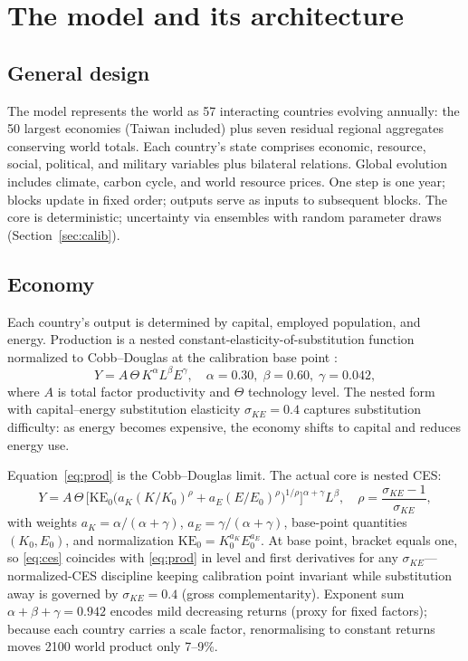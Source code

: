 \documentclass[a4paper,fleqn]{cas-sc}
\begin{document}
\section{The model and its architecture}


\subsection{General design}

The model represents the world as 57 interacting countries evolving annually: the 50 largest economies (Taiwan included) plus seven residual regional aggregates conserving world totals. Each country's state comprises economic, resource, social, political, and military variables plus bilateral relations. Global evolution includes climate, carbon cycle, and world resource prices. One step is one year; blocks update in fixed order; outputs serve as inputs to subsequent blocks. The core is deterministic; uncertainty via ensembles with random parameter draws (Section~\ref{sec:calib}).

\subsection{Economy}

Each country's output is determined by capital, employed population, and energy. Production is a nested constant-elasticity-of-substitution function normalized to Cobb--Douglas at the calibration base point \citep{arrow1961}:
\begin{equation}
Y = A \, \Theta \, K^{\alpha} L^{\beta} E^{\gamma}, \quad \alpha = 0.30,\; \beta = 0.60,\; \gamma = 0.042,
\label{eq:prod}
\end{equation}
where $A$ is total factor productivity and $\Theta$ technology level. The nested form with capital--energy substitution elasticity $\sigma_{KE}=0.4$ \citep{vanderwerf2008,koetse2008} captures substitution difficulty: as energy becomes expensive, the economy shifts to capital and reduces energy use.

Equation~\eqref{eq:prod} is the Cobb--Douglas limit. The actual core is nested CES:
\begin{equation}
Y = A\,\Theta\,\Big[\mathrm{KE}_0\big(a_K (K/K_0)^{\rho} + a_E (E/E_0)^{\rho}\big)^{1/\rho}\Big]^{\alpha+\gamma} L^{\beta}, \quad \rho = \frac{\sigma_{KE}-1}{\sigma_{KE}},
\label{eq:ces}
\end{equation}
with weights $a_K = \alpha/(\alpha+\gamma)$, $a_E = \gamma/(\alpha+\gamma)$, base-point quantities $(K_0,E_0)$, and normalization $\mathrm{KE}_0 = K_0^{a_K} E_0^{a_E}$. At base point, bracket equals one, so \eqref{eq:ces} coincides with \eqref{eq:prod} in level and first derivatives for any $\sigma_{KE}$---normalized-CES discipline keeping calibration point invariant while substitution away is governed by $\sigma_{KE}=0.4$ (gross complementarity). Exponent sum $\alpha+\beta+\gamma = 0.942$ encodes mild decreasing returns (proxy for fixed factors); because each country carries a scale factor, renormalising to constant returns moves 2100 world product only 7--9\%.
\end{document}
